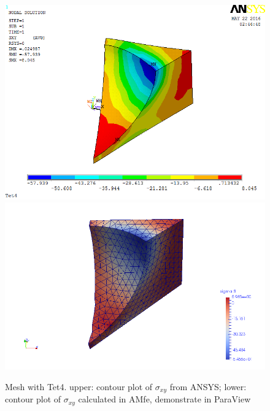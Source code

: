 \begin{figure}[htbp]
	\begin{center}
		\includegraphics[width=13cm,clip]{Tet4Sxy.png} 		
		\includegraphics[width=13cm,clip]{Tet4SxyP.png} 		
		\caption{Mesh with Tet4. upper: contour plot of $\sigma_{xy}$ from ANSYS; lower: contour plot of $\sigma_{xy}$ calculated in AMfe, demonstrate in ParaView} \label{fig: Tet4Sxy}
	\end{center}
\end{figure}
\clearpage 

